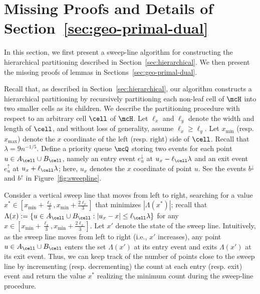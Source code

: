 \section{Missing Proofs and Details of Section~\ref{sec:geo-primal-dual}}\label{sec:appendix-geo-primal-dual}
In this section, we first present a sweep-line algorithm for constructing the hierarchical partitioning described in Section~\ref{sec:hierarchical}. We then present the missing proofs of lemmas in Sections~\ref{sec:geo-primal-dual}.


 Recall that, as described in Section~\ref{sec:hierarchical}, our algorithm constructs a hierarchical partitioning by recursively partitioning each non-leaf cell of $\mcH$ into two smaller cells as its children. We describe the partitioning procedure with respect to an arbitrary cell $\cell$ of $\mcH$. Let $\ell_x$ and $\ell_y$ denote the width and length of $\cell$, and without loss of generality, assume $\ell_x\ge \ell_y$. Let $x_{\min}$ (resp. $x_{\max}$) denote the $x$ coordinate of the left (resp. right) side of $\cell$. Recall that $\lambda=9n^{-1/5}$. Define a priority queue $\mcQ$ storing two events for each point $u\in A_\cell\cup B_\cell$, namely an entry event $e_u^\downarrow$ at $u_x-\ell_\cell\lambda$ and an exit event $e_u^\uparrow$ at $u_x + \ell_\cell\lambda$; here, $u_x$ denotes the $x$ coordinate of point $u$. See the events $b^\downarrow$ and $b^\uparrow$ in Figure~\ref{fig:sweepline}.

Consider a vertical sweep line that moves from left to right, searching for a value $x^* \in [x_{\min} + \frac{\ell_x}{3}, x_{\min} + \frac{2\ell_x}{3}]$ that minimizes $|\Lambda(x^*)|$; recall that $\Lambda(x):=\{u\in A_\cell\cup B_\cell: |u_x-x|\le \ell_\cell\lambda\}$ for any $x\in [x_{\min} + \frac{\ell_x}{3}, x_{\min} + \frac{2\ell_x}{3}]$. Let $x'$ denote the state of the sweep line. Intuitively, as the sweep line moves from left to right (i.e., $x'$ increases), any point $u\in A_\cell\cup B_\cell$ enters the set $\Lambda(x')$ at its entry event and exits $\Lambda(x')$ at its exit event. Thus, we can keep track of the number of points close to the sweep line by incrementing (resp. decrementing) the count at each entry (resp. exit) event and return the value $x^*$ realizing the minimum count during the sweep-line procedure. 

